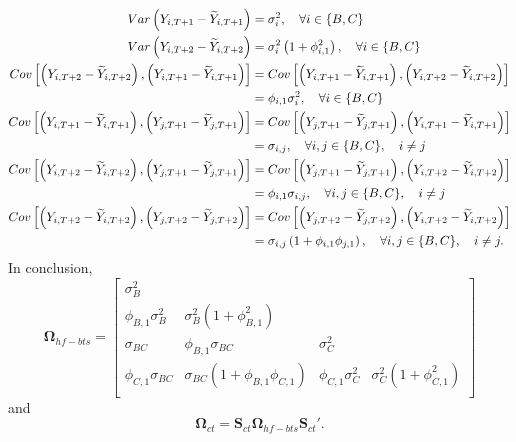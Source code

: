 \documentclass[a4paper,11pt]{article}
\newcommand{\Svet}{\bm{S}}
\newcommand{\Omegavet}{\bm{\Omega}}
\theoremstyle{definition}
\begin{document}
\begin{align*}\allowdisplaybreaks[2]
	Var\left(Y_{i,T+1}-\widetilde{Y}_{i,T+1}\right) &= \sigma_i^2, \quad \forall i \in \{B, C\}\\
	Var\left(Y_{i,T+2}-\widetilde{Y}_{i,T+2}\right) &= \sigma_i^2\left(1+\phi_{i,1}^2\right), \quad \forall i \in \{B, C\}\\
	Cov\left[\left(Y_{i,T+2}-\widetilde{Y}_{i,T+2}\right), \left(Y_{i,T+1}-\widetilde{Y}_{i,T+1}\right)\right] & = 	Cov\left[\left(Y_{i,T+1}-\widetilde{Y}_{i,T+1}\right), \left(Y_{i,T+2}-\widetilde{Y}_{i,T+2}\right)\right]\\
	& = \phi_{i, 1}\sigma_{i}^2, \quad \forall i \in \{B, C\}\\
	Cov\left[\left(Y_{i,T+1}-\widetilde{Y}_{i,T+1}\right), \left(Y_{j,T+1}-\widetilde{Y}_{j,T+1}\right)\right] & = 	Cov\left[\left(Y_{j,T+1}-\widetilde{Y}_{j,T+1}\right), \left(Y_{i,T+1}-\widetilde{Y}_{i,T+1}\right)\right]\\
	& = \sigma_{i, j}, \quad \forall i,j \in \{B, C\}, \quad i\neq j\\
	Cov\left[\left(Y_{i,T+2}-\widetilde{Y}_{i,T+2}\right), \left(Y_{j,T+1}-\widetilde{Y}_{j,T+1}\right)\right] & = 	Cov\left[\left(Y_{j,T+1}-\widetilde{Y}_{j,T+1}\right), \left(Y_{i,T+2}-\widetilde{Y}_{i,T+2}\right)\right]\\
	& = \phi_{i,1}\sigma_{i, j}, \quad \forall i,j \in \{B, C\}, \quad i\neq j\\
		Cov\left[\left(Y_{i,T+2}-\widetilde{Y}_{i,T+2}\right), \left(Y_{j,T+2}-\widetilde{Y}_{j,T+2}\right)\right] & = 	Cov\left[\left(Y_{j,T+2}-\widetilde{Y}_{j,T+2}\right), \left(Y_{i,T+2}-\widetilde{Y}_{i,T+2}\right)\right]\\
	& = \sigma_{i, j}\left(1+\phi_{i,1}\phi_{j,1}\right), \quad \forall i,j \in \{B, C\}, \quad i\neq j.
\end{align*}
In conclusion,
$$
\Omegavet_{hf-bts} = \begin{bmatrix}
	\sigma^2_B & & & \\
	\phi_{B,1}\sigma_B^2 & \sigma_B^2\left(1+\phi_{B,1}^2\right) & & \\
	\sigma_{BC} & \phi_{B,1}\sigma_{BC} & \sigma_C^2& \\
	\phi_{C,1}\sigma_{BC} & \sigma_{BC}\left(1+\phi_{B,1}\phi_{C,1} \right)& \phi_{C,1}\sigma_C^2 & \sigma_C^2\left(1+\phi_{C,1}^2\right)\\
\end{bmatrix}
$$
and
$$
\Omegavet_{ct} = \Svet_{ct}\Omegavet_{hf-bts}\Svet_{ct}'.
$$
\end{document}
